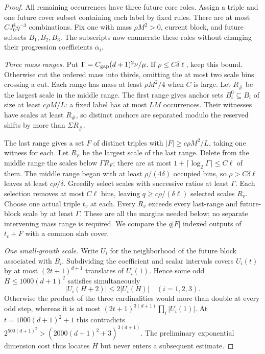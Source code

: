 \documentclass[11pt]{article}
\theoremstyle{definition}
\numberwithin{equation}{section}
\begin{document}
\begin{proof}
All remaining occurrences have three future core roles. Assign a triple and one future cover subset containing each label by fixed rules. There are at most $CJ_0^4\eta^{-3}$ combinations. Fix one with mass $\rho M^2>0$, current block, and future subsets $B_1,B_2,B_3$. The subscripts now enumerate these roles without changing their progression coefficients $\alpha_i$.

\emph{Three mass ranges.} Put $\Gamma=C_{\rm gap}(d+1)^2\nu/\mu$. If $\rho\le C\delta\ell$, keep this bound. Otherwise cut the ordered mass into thirds, omitting the at most two scale bins crossing a cut. Each range has mass at least $\rho M^2/4$ when $C$ is large. Let $R_\#$ be the largest scale in the middle range. The first range gives anchor sets $B_i^0\subseteq B_i$ of size at least $c\rho M/L$: a fixed label has at most $LM$ occurrences. Their witnesses have scales at least $R_\#$, so distinct anchors are separated modulo the reserved shifts by more than $\Sigma R_\#$.

The last range gives a set $F$ of distinct triples with $|F|\ge c\rho M^2/L$, taking one witness for each. Let $R_F$ be the largest scale of the last range. Delete from the middle range the scales below $\Gamma R_F$; there are at most $1+\lceil\log_2\Gamma\rceil\le C\ell$ of them. The middle range began with at least $\rho/(4\delta)$ occupied bins, so $\rho>C\delta\ell$ leaves at least $c\rho/\delta$. Greedily select scales with successive ratios at least $\Gamma$. Each selection removes at most $C\ell$ bins, leaving $q\ge c\rho/(\delta\ell)$ selected scales $R_v$. Choose one actual triple $t_v$ at each. Every $R_v$ exceeds every last-range and future-block scale by at least $\Gamma$. These are all the margins needed below; no separate intervening mass range is required. We compare the $q|F|$ indexed outputs of $t_v+F$ with a common slab cover.

\emph{One small-growth scale.} Write $U_i$ for the neighborhood of the future block associated with $B_i$. Subdividing the coefficient and scalar intervals covers $U_i(t)$ by at most $(2t+1)^{d+1}$ translates of $U_i(1)$. Hence some odd $H\le1000(d+1)^2$ satisfies simultaneously
\[
 |U_i(H+2)|\le2|U_i(H)|\quad(i=1,2,3).
\]
Otherwise the product of the three cardinalities would more than double at every odd step, whereas it is at most $(2t+1)^{3(d+1)}\prod_i|U_i(1)|$. At $t=1000(d+1)^2+1$ this contradicts $2^{500(d+1)^2}>(2000(d+1)^2+3)^{3(d+1)}$. The preliminary exponential dimension cost thus locates $H$ but never enters a subsequent estimate.


\end{proof}
\end{document}
